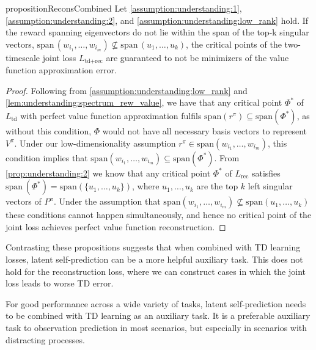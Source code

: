 \begin{restatable}{proposition}{ReconsCombined}
    Let \autoref{assumption:understanding:1}, \autoref{assumption:understanding:2}, and \autoref{assumption:understanding:low_rank} hold. If the reward spanning eigenvectors do not lie within the span of the top-k singular vectors, $\mathrm{span}\,(w_{i_1},\allowbreak \dots,\allowbreak w_{i_m}) \not\subseteq \mathrm{span}\,(u_1,\dots,u_k)$, the critical points of the two-timescale joint loss $L_{\text{td}+\text{rec}}$ are guaranteed to not be minimizers of the value function approximation error. 
\end{restatable}
\begin{proof}
    Following from \autoref{assumption:understanding:low_rank} and \cref{lem:understanding:spectrum_rew_value}, we have that any critical point $\Phi^*$ of $L_\text{td}$ with perfect value function approximation fulfils $\mathrm{span}(r^\pi)\subseteq \mathrm{span}(\Phi^*)$, as without this condition, $\Phi$ would not have all necessary basis vectors to represent $V^\pi$. Under our low-dimensionality assumption $r^\pi \in \mathrm{span}(w_{i_1},\dots,w_{i_m})$, this condition implies that $\mathrm{span}(w_{i_1},\dots,w_{i_m})\subseteq \mathrm{span}(\Phi^*)$. From \cref{prop:understanding:2} we know that any critical point $\Phi^*$ of $L_\text{rec}$ satisfies $\mathrm{span}\,({\Phi^*})=\mathrm{span}\left(\{u_1,\dots,u_k\}\right)$, where $u_1,\dots,u_k$ are the top $k$ left singular vectors of $P^\pi$. Under the assumption that $\mathrm{span}(w_{i_1},\dots,w_{i_m}) \not\subseteq \mathrm{span}(u_1,\dots,u_k)$ these conditions cannot happen simultaneously, and hence no critical point of the joint loss achieves perfect value function reconstruction.
\end{proof}


Contrasting these propositions suggests that when combined with TD learning losses, latent self-prediction can be a more helpful auxiliary task. 
This does not hold for the reconstruction loss, where we can construct cases in which the joint loss leads to worse TD error.

\begin{tcolorbox}[boxrule=0.2mm,colback=white,colframe=uoftblue,boxsep=0pt,top=3pt,bottom=5pt]
\begin{insight} 
For good performance across a wide variety of tasks, latent self-prediction needs to be combined with TD learning as an auxiliary task. It is a preferable auxiliary task to observation prediction in most scenarios, but especially in scenarios with distracting processes.
\label{insight:understanding:3}
\end{insight}
\end{tcolorbox}


